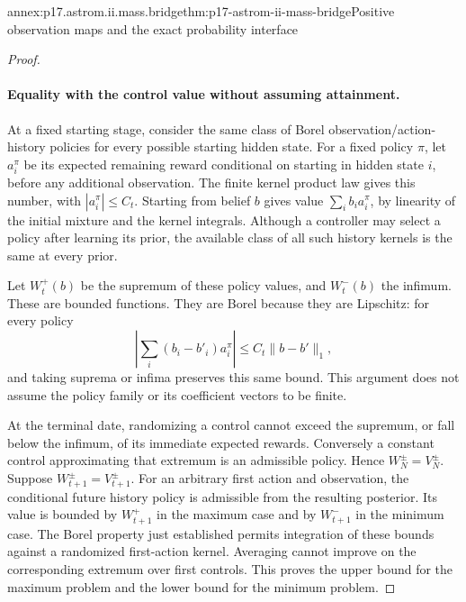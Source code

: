 \begin{annexitem}{annex:p17.astrom.ii.mass.bridge}{thm:p17-astrom-ii-mass-bridge}{Positive observation maps and the exact probability interface}
\begin{proof}
\paragraph{Equality with the control value without assuming attainment.}
At a fixed starting stage, consider the same class
of Borel observation/action-history policies for
every possible starting hidden state.
For a fixed policy \(\pi\), let \(a_i^\pi\) be its
expected remaining reward conditional on starting
in hidden state \(i\), before any additional
observation. The finite kernel product law gives
this number, with \(|a_i^\pi|\leq C_t\).
Starting from belief \(b\) gives value
\(\sum_i b_i a_i^\pi\), by linearity of the initial
mixture and the kernel integrals.
Although a controller may select a policy after
learning its prior, the available class of all
such history kernels is the same at every prior.

Let \(W_t^+(b)\) be the supremum of these policy
values, and \(W_t^-(b)\) the infimum.
These are bounded functions. They are Borel because
they are Lipschitz:
for every policy
\[
 \left|\sum_i(b_i-b'_i)a_i^\pi\right|
                              \leq C_t\|b-b'\|_1,
\]
and taking suprema or infima preserves this same
bound. This argument does not assume the policy
family or its coefficient vectors to be finite.

At the terminal date, randomizing a control cannot
exceed the supremum, or fall below the infimum,
of its immediate expected rewards. Conversely a
constant control approximating that extremum is
an admissible policy. Hence \(W_N^\pm=V_N^\pm\).
Suppose \(W_{t+1}^\pm=V_{t+1}^\pm\).
For an arbitrary first action and observation,
the conditional future history policy is admissible
from the resulting posterior. Its value is bounded
by \(W_{t+1}^+\) in the maximum case and by
\(W_{t+1}^-\) in the minimum case.
The Borel property just established permits
integration of these bounds against a randomized
first-action kernel. Averaging cannot improve
on the corresponding extremum over first controls.
This proves the upper bound for the maximum
problem and the lower bound for the minimum problem.


\end{proof}
\end{annexitem}
